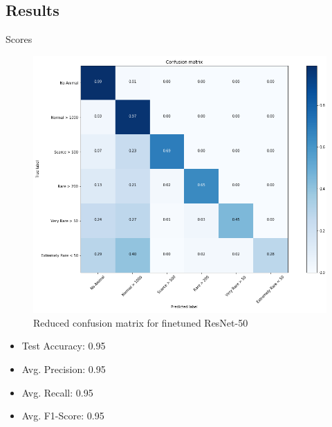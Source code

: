\documentclass[10pt]{beamer}
\begin{document}
\subsection{Results}

\begin{frame}{Scores}
	\centering
	\begin{minipage}[c]{0.58\linewidth}
		\begin{figure}
			\includegraphics[width=\columnwidth]{images/conf_mat_simple.png}
			\caption{Reduced confusion matrix for finetuned ResNet-50}
		\end{figure}
	\end{minipage}
	\begin{minipage}[c]{0.38\linewidth}
		\begin{itemize}
			\item Test Accuracy: 0.95
			\item Avg. Precision:  0.95
			\item Avg. Recall: 0.95
			\item Avg. F1-Score: 0.95
		\end{itemize}
	\end{minipage}
\end{frame}

\end{document}
